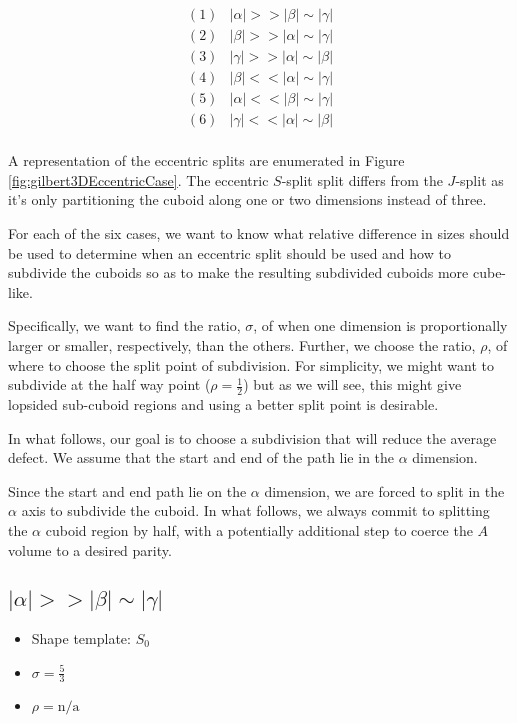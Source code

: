 $$
\begin{array}{ll}
  (1) & |\alpha| >> |\beta| \sim |\gamma| \\
  (2) & |\beta| >> |\alpha| \sim |\gamma| \\
  (3) & |\gamma| >> |\alpha| \sim |\beta| \\
  (4) & |\beta| << |\alpha| \sim |\gamma| \\
  (5) & |\alpha| << |\beta| \sim |\gamma| \\
  (6) & |\gamma| << |\alpha| \sim |\beta| \\
\end{array}
$$

A representation of the eccentric splits are enumerated in Figure \ref{fig:gilbert3DEccentricCase}.
The eccentric $S$-split split differs from the $J$-split as it's only partitioning the cuboid along
one or two dimensions instead of three.

For each of the six cases, we want to know what relative difference in sizes should be used
to determine when an eccentric split should be used and how to subdivide the cuboids so as to make
the resulting subdivided cuboids more cube-like.

Specifically, we want to find the ratio, $\sigma$, of when one dimension is proportionally larger or smaller,
respectively, than the others.
Further, we choose the ratio, $\rho$, of where to choose the split point of subdivision.
For simplicity, we might want to subdivide at the half way point ($\rho = \frac{1}{2}$) but as we
will see, this might give lopsided sub-cuboid regions and using a better split point is desirable.

In what follows, our goal is to choose a subdivision that will reduce the average defect.
We assume that the start and end of the path lie in the $\alpha$ dimension.

Since the start and end path lie on the $\alpha$ dimension, we are forced to split in the $\alpha$ axis
to subdivide the cuboid.
In what follows, we always commit to splitting the $\alpha$ cuboid region by half, with a potentially
additional step to coerce the $A$ volume to a desired parity.


\subsection{$|\alpha| >> |\beta| \sim |\gamma|$}

\begin{itemize}
  \item Shape template: $S_0$
  \item $\sigma = \frac{5}{3}$
  \item $\rho = \text{n/a}$
\end{itemize}


